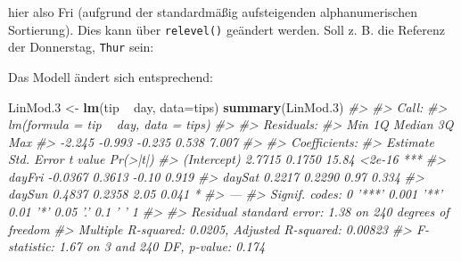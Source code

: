 \documentclass[12pt,]{book}
\newenvironment{Shaded}{\begin{snugshade}}{\end{snugshade}}
\newcommand{\KeywordTok}[1]{\textcolor[rgb]{0.13,0.29,0.53}{\textbf{{#1}}}}
\newcommand{\DataTypeTok}[1]{\textcolor[rgb]{0.13,0.29,0.53}{{#1}}}
\newcommand{\FloatTok}[1]{\textcolor[rgb]{0.00,0.00,0.81}{{#1}}}
\newcommand{\StringTok}[1]{\textcolor[rgb]{0.31,0.60,0.02}{{#1}}}
\newcommand{\CommentTok}[1]{\textcolor[rgb]{0.56,0.35,0.01}{\textit{{#1}}}}
\newcommand{\NormalTok}[1]{{#1}}
\begin{document}
\begin{Shaded}
\end{Shaded}

hier also Fri (aufgrund der standardmäßig aufsteigenden alphanumerischen
Sortierung). Dies kann über \texttt{relevel()} geändert werden. Soll z.
B. die Referenz der Donnerstag, \texttt{Thur} sein:

\begin{Shaded}
\end{Shaded}

Das Modell ändert sich entsprechend:

\begin{Shaded}
\begin{Highlighting}[]
\NormalTok{LinMod}\FloatTok{.3} \NormalTok{<-}\StringTok{ }\KeywordTok{lm}\NormalTok{(tip ~}\StringTok{ }\NormalTok{day, }\DataTypeTok{data=}\NormalTok{tips)}
\KeywordTok{summary}\NormalTok{(LinMod}\FloatTok{.3}\NormalTok{)}
\CommentTok{#> }
\CommentTok{#> Call:}
\CommentTok{#> lm(formula = tip ~ day, data = tips)}
\CommentTok{#> }
\CommentTok{#> Residuals:}
\CommentTok{#>    Min     1Q Median     3Q    Max }
\CommentTok{#> -2.245 -0.993 -0.235  0.538  7.007 }
\CommentTok{#> }
\CommentTok{#> Coefficients:}
\CommentTok{#>             Estimate Std. Error t value Pr(>|t|)    }
\CommentTok{#> (Intercept)   2.7715     0.1750   15.84   <2e-16 ***}
\CommentTok{#> dayFri       -0.0367     0.3613   -0.10    0.919    }
\CommentTok{#> daySat        0.2217     0.2290    0.97    0.334    }
\CommentTok{#> daySun        0.4837     0.2358    2.05    0.041 *  }
\CommentTok{#> ---}
\CommentTok{#> Signif. codes:  0 '***' 0.001 '**' 0.01 '*' 0.05 '.' 0.1 ' ' 1}
\CommentTok{#> }
\CommentTok{#> Residual standard error: 1.38 on 240 degrees of freedom}
\CommentTok{#> Multiple R-squared:  0.0205, Adjusted R-squared:  0.00823 }
\CommentTok{#> F-statistic: 1.67 on 3 and 240 DF,  p-value: 0.174}
\end{Highlighting}
\end{Shaded}
\end{document}
